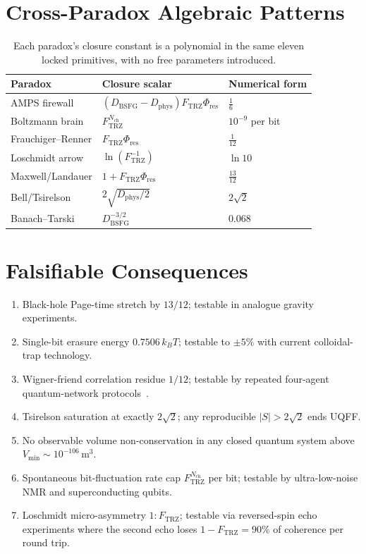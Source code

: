 \documentclass[11pt]{article}
\newcommand{\Ftrz}{F_{\mathrm{TRZ}}}
\newcommand{\Phires}{\Phi_{\mathrm{res}}}
\newcommand{\Dphys}{D_{\mathrm{phys}}}
\newcommand{\Dbsfg}{D_{\mathrm{BSFG}}}
\newcommand{\Nch}{N_{\mathrm{ch}}}
\newcommand{\Vmin}{V_{\mathrm{min}}}
\begin{document}
\section{Cross-Paradox Algebraic Patterns}

\begin{table}[h!]
\centering
\begin{tabular}{lll}
\toprule
Paradox & Closure scalar & Numerical form \\
\midrule
AMPS firewall          & $(\Dbsfg-\Dphys)\Ftrz\Phires$ & $\tfrac{1}{6}$ \\
Boltzmann brain        & $\Ftrz^{\Nch}$                 & $10^{-9}$ per bit \\
Frauchiger--Renner     & $\Ftrz\Phires$                 & $\tfrac{1}{12}$ \\
Loschmidt arrow        & $\ln(\Ftrz^{-1})$              & $\ln 10$ \\
Maxwell/Landauer       & $1+\Ftrz\Phires$               & $\tfrac{13}{12}$ \\
Bell/Tsirelson         & $2\sqrt{\Dphys/2}$             & $2\sqrt{2}$ \\
Banach--Tarski         & $\Dbsfg^{-3/2}$                & $0.068$ \\
\bottomrule
\end{tabular}
\caption{Each paradox's closure constant is a polynomial in the same eleven locked primitives, with no free parameters introduced.}
\end{table}

\section{Falsifiable Consequences}

\begin{enumerate}[label=(F\arabic*)]
\item Black-hole Page-time stretch by $13/12$; testable in analogue gravity experiments.
\item Single-bit erasure energy $0.7506\,k_B T$; testable to $\pm5\%$ with current colloidal-trap technology.
\item Wigner-friend correlation residue $1/12$; testable by repeated four-agent quantum-network protocols~\cite{Proietti2019}.
\item Tsirelson saturation at exactly $2\sqrt{2}$; any reproducible $|S|>2\sqrt{2}$ ends UQFF.
\item No observable volume non-conservation in any closed quantum system above $\Vmin\sim10^{-106}\,\text{m}^3$.
\item Spontaneous bit-fluctuation rate cap $\Ftrz^{\Nch}$ per bit; testable by ultra-low-noise NMR and superconducting qubits.
\item Loschmidt micro-asymmetry $1:\Ftrz$; testable via reversed-spin echo experiments where the second echo loses $1-\Ftrz=90\%$ of coherence per round trip.
\end{enumerate}
\end{document}
